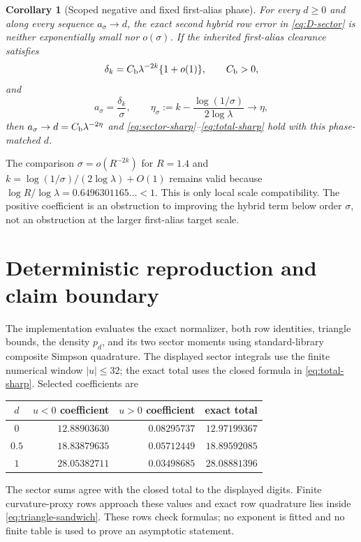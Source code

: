 \documentclass[11pt]{article}
\newtheorem{corollary}[theorem]{Corollary}
\theoremstyle{definition}
\theoremstyle{remark}
\newcommand{\1}{\mathbf 1}
\begin{document}
\begin{corollary}[Scoped negative and fixed first-alias phase]
\label{cor:negative-phase}
For every $d\ge0$ and along every sequence $a_\sigma\to d$, the exact
second hybrid row error in \eqref{eq:D-sector} is neither exponentially
small nor $o(\sigma)$.
If the inherited first-alias clearance satisfies
\[
 \delta_k=C_{\rm b}\lambda^{-2k}\{1+o(1)\},
 \qquad C_{\rm b}>0,
\]
and
\[
 a_\sigma=\frac{\delta_k}{\sigma},
 \qquad
 \eta_\sigma:=k-\frac{\log(1/\sigma)}{2\log\lambda}
 \longrightarrow\eta,
\]
then
$a_\sigma\to d=C_{\rm b}\lambda^{-2\eta}$ and
\eqref{eq:sector-sharp}--\eqref{eq:total-sharp} hold with this phase-matched
$d$.
\end{corollary}

The comparison $\sigma=o(R^{-2k})$ for $R=1.4$ and
$k=\log(1/\sigma)/(2\log\lambda)+O(1)$ remains valid because
$\log R/\log\lambda=0.6496301165\ldots<1$.  This is only local scale
compatibility.  The positive coefficient is an obstruction to improving
the hybrid term below order $\sigma$, not an obstruction at the larger
first-alias target scale.

\section{Deterministic reproduction and claim boundary}

The implementation evaluates the exact normalizer, both row identities,
triangle bounds, the density $p_d$, and its two sector moments using
standard-library composite Simpson quadrature.  The displayed sector
integrals use the finite numerical window $|u|\le32$; the exact total uses
the closed formula in \eqref{eq:total-sharp}.  Selected coefficients are
\begin{center}
\begin{tabular}{c@{\quad}rrr}
\toprule
$d$ & $u<0$ coefficient & $u>0$ coefficient & exact total\\
\midrule
$0$   & $12.88903630$ & $0.08295737$ & $12.97199367$\\
$0.5$ & $18.83879635$ & $0.05712449$ & $18.89592085$\\
$1$   & $28.05382711$ & $0.03498685$ & $28.08881396$\\
\bottomrule
\end{tabular}
\end{center}
The sector sums agree with the closed total to the displayed digits.  Finite
curvature-proxy rows approach these values and exact row quadrature lies
inside \eqref{eq:triangle-sandwich}.  These rows check formulas; no exponent
is fitted and no finite table is used to prove an asymptotic statement.
\end{document}
